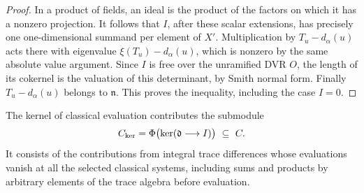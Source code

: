 \documentclass[a4paper,11pt]{article}
\theoremstyle{definition}
\theoremstyle{remark}
\numberwithin{equation}{section}
\begin{document}
\begin{proof}
In a product of fields, an ideal is the product of the factors
on which it has a nonzero projection. It follows that \(I\),
after these scalar extensions, has precisely one
one-dimensional summand per element of \(X'\). Multiplication
by \(T_u-d_\alpha(u)\) acts there with eigenvalue
\(\xi(T_u)-d_\alpha(u)\), which is nonzero by the same absolute
value argument. Since \(I\) is free over the unramified DVR
\(O\), the length of its cokernel is the valuation of this
determinant, by Smith normal form. Finally \(T_u-d_\alpha(u)\)
belongs to \(\mathfrak n\). This proves the inequality, including
the case \(I=0\).
\end{proof}

The kernel of classical evaluation contributes the submodule
\[
 C_{\rm ker}=\Phi\bigl(\ker(\mathfrak d\longrightarrow I)\bigr)
       \ \subseteq\ C .
\]
It consists of the contributions from integral trace differences
whose evaluations vanish at all the selected classical systems,
including sums and products by arbitrary elements of the trace
algebra before evaluation.
\end{document}
